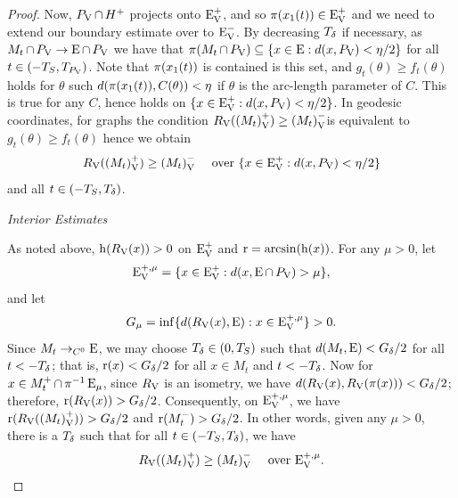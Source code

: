 \documentclass{amsart}
\begin{document}
\begin{proof}
Now, \(P_{\operatorname{V}} \operatorname{\cap} H^+\) projects onto \({\operatorname{E}}_{\operatorname{V}}^+\), and so \(\operatorname{\pi}(x_1(t)) \in {\operatorname{E}}_{\operatorname{V}}^+\) and we need to extend our boundary estimate over to \({\operatorname{E}}_{\operatorname{V}}^-\). By decreasing \(T_{\operatorname{\delta}}\) if necessary, as \(M_t\operatorname{\cap}P_{\operatorname{V}} \to \operatorname{E}\operatorname{\cap}P_{\operatorname{V}}\) we have that \(\operatorname{\pi}(M_t\operatorname{\cap}P_{\operatorname{V}}) \subseteq \{x \in \operatorname{E} : d(x, P_{\operatorname{V}}) < \eta/2\}\) for all \(t \in (-T_S, T_{P_{\operatorname{V}}})\). Note that \(\operatorname{\pi}(x_1(t))\) is contained is this set, and \(g_t(\theta) \geq f_t (\theta)\) holds for \(\theta\) such \(d(\operatorname{\pi}(x_1(t)), C(\theta)) < \eta\) if \(\theta\) is the arc-length parameter of \(C\). This is true for any \(C\), hence holds on \(\{x \in {\operatorname{E}}_{\operatorname{V}}^+ : d(x, P_{\operatorname{V}}) < \eta/2\}\). In geodesic coordinates, for graphs the condition \(R_{\operatorname{V}}({(M_t)}_{\operatorname{V}}^+) \geq {(M_t)}_{\operatorname{V}}^-\)is equivalent to \(g_t(\theta) \geq f_t (\theta)\) hence we obtain
\begin{equation}
\label{eq:boundaryestimate}
R_{\operatorname{V}}({(M_t)}_{\operatorname{V}}^+) \geq {(M_t)}_{\operatorname{V}}^- \quad \text{ over } \{x \in {\operatorname{E}}_{\operatorname{V}}^+: d(x, P_{\operatorname{V}}) < \eta/2\}
\end{equation}
and all \(t \in (-T_S, T_{\operatorname{\delta}})\).

\emph{Interior Estimates}

As noted above, \(\operatorname{h}(R_{\operatorname{V}}(x)) > 0\) on \({\operatorname{E}}_{\operatorname{V}}^+\) and \(\operatorname{r} = \arcsin(\operatorname{h}(x))\). For any \(\mu > 0\), let
\[
{\operatorname{E}}_{\operatorname{V}}^{+,\mu} = \{x \in {\operatorname{E}}_{\operatorname{V}}^+: d(x, \operatorname{E} \operatorname{\cap} P_{\operatorname{V}}) > \mu\},
\]
and let
\[
G_{\mu} = \inf\{d(R_{\operatorname{V}}(x), \operatorname{E}) : x \in {\operatorname{E}}_{\operatorname{V}}^{+,\mu}\} > 0.
\]
Since \(M_t \to_{C^0} \operatorname{E}\), we may choose \(T_{\operatorname{\delta}} \in (0, T_S)\) such that \(d(M_t, \operatorname{E}) < G_{\operatorname{\delta}}/2\) for all \(t < -T_{\operatorname{\delta}}\); that is, \(\operatorname{r} (x) < G_{\operatorname{\delta}}/2\) for all \(x \in M_t\) and \(t < -T_{\operatorname{\delta}}\). Now for \(x \in M_t^+ \operatorname{\cap} \operatorname{\pi}^{-1} \operatorname{E}_{\mu}\), since \(R_{\operatorname{V}}\) is an isometry, we have \(d(R_{\operatorname{V}}(x), R_{\operatorname{V}}(\operatorname{\pi}(x))) < G_{\operatorname{\delta}}/2\); therefore, \(\operatorname{r}(R_{\operatorname{V}}(x)) > G_{\operatorname{\delta}}/2\). Consequently, on \({\operatorname{E}}_{\operatorname{V}}^{+,\mu}\), we have \(\operatorname{r}(R_{\operatorname{V}}({(M_t)}_{\operatorname{V}}^+)) > G_{\operatorname{\delta}}/2\) and \(\operatorname{r}(M_t^-) > G_{\operatorname{\delta}}/2\). In other words, given any \(\mu>0\), there is a \(T_{\operatorname{\delta}}\) such that for all \(t \in (-T_S,T_{\operatorname{\delta}})\),  we have
\begin{equation}
\label{eq:interiorestimate}
R_{\operatorname{V}}({(M_t)}_{\operatorname{V}}^+) \geq {(M_t)}_{\operatorname{V}}^- \quad \text{ over } {\operatorname{E}}_{\operatorname{V}}^{+,\mu}.
\end{equation}


\end{proof}
\end{document}
